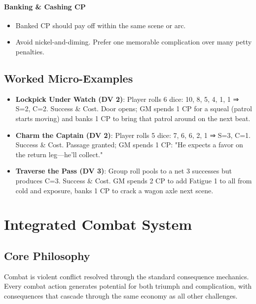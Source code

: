 \documentclass[11pt]{article}
\begin{document}
\paragraph{Banking \& Cashing CP}
\begin{itemize}
    \item Banked CP should pay off within the same scene or arc.
    \item Avoid nickel-and-diming. Prefer one memorable complication over many petty penalties.
\end{itemize}

\subsection{Worked Micro-Examples}
\begin{itemize}
    \item \textbf{Lockpick Under Watch (DV 2)}: Player rolls 6 dice: 10, 8, 5, 4, 1, 1 ⇒ S=2, C=2. Success \& Cost. Door opens; GM spends 1 CP for a squeal (patrol starts moving) and banks 1 CP to bring that patrol around on the next beat.
    \item \textbf{Charm the Captain (DV 2)}: Player rolls 5 dice: 7, 6, 6, 2, 1 ⇒ S=3, C=1. Success \& Cost. Passage granted; GM spends 1 CP: "He expects a favor on the return leg—he'll collect."
    \item \textbf{Traverse the Pass (DV 3)}: Group roll pools to a net 3 successes but produces C=3. Success \& Cost. GM spends 2 CP to add Fatigue 1 to all from cold and exposure, banks 1 CP to crack a wagon axle next scene.
\end{itemize}

\section{Integrated Combat System}

\subsection{Core Philosophy}
Combat is violent conflict resolved through the standard consequence mechanics. Every combat action generates potential for both triumph and complication, with consequences that cascade through the same economy as all other challenges.
\end{document}
